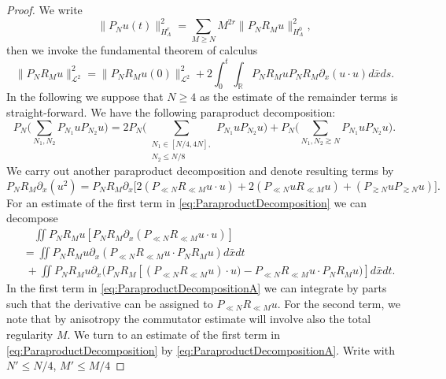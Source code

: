 \documentclass{amsart}
\theoremstyle{definition}
\newcommand{\R}{\mathbb{R}}
\begin{document}
\begin{proof}
We write
\begin{equation*}
\| P_N u(t) \|^2_{H^r_{\Lambda}} = \sum_{M \geq N} M^{2 r} \| P_N R_M u \|^2_{H^0_\Lambda},
\end{equation*}
then we invoke the fundamental theorem of calculus
\begin{equation*}
\| P_N R_M u \|^2_{\mathcal{L}^2} = \| P_N R_M u(0) \|^2_{\mathcal{L}^2} + 2 \int_0^t \int_{\R} P_N R_M u P_N R_M \partial_x (u \cdot u) d\overline{x} ds.
\end{equation*}
In the following we suppose that $N \geq 4$ as the estimate of the remainder terms is straight-forward. We have the following paraproduct decomposition:
\begin{equation*}
P_N \big( \sum_{N_1,N_2} P_{N_1} u P_{N_2} u \big) = 2 P_N \big( \sum_{\substack{N_1 \in [N/4,4N], \\ N_2 \leq N/8}} P_{N_1} u P_{N_2} u \big) + P_N \big( \sum_{N_1,N_2 \gtrsim N} P_{N_1} u P_{N_2} u \big).
\end{equation*}
We carry out another paraproduct decomposition and denote resulting terms by
\begin{equation}
\label{eq:ParaproductDecomposition}
P_N R_M \partial_x (u^2) = P_N R_M \partial_x \big[ 2(P_{\ll N} R_{\ll M} u \cdot u) + 2 (P_{\ll N} u R_{\ll M} u) + (P_{\gtrsim N} u P_{\gtrsim N} u) \big].
\end{equation}
For an estimate of the first term in \eqref{eq:ParaproductDecomposition}
we can decompose
\begin{equation}
\label{eq:ParaproductDecompositionA}
\begin{split}
&\quad \iint P_N R_M u [P_N R_M \partial_x (P_{\ll N} R_{\ll M} u \cdot u)] \\
&= \iint P_N R_M u \partial_x (P_{\ll N} R_{\ll M} u \cdot P_N R_M u) d\bar{x} dt \\
&\; + \iint P_N R_M u \partial_x (P_N R_M [(P_{\ll N} R_{\ll M} u) \cdot u) - P_{\ll N} R_{\ll M} u \cdot P_N R_M u) ] d \bar{x} dt.
\end{split} 
\end{equation}
In the first term in \eqref{eq:ParaproductDecompositionA} we can integrate by parts such that the derivative can be assigned to $P_{\ll N} R_{\ll M} u$. For the second term, we note that by anisotropy the commutator estimate will involve also the total regularity $M$.
We turn to an estimate of the first term in \eqref{eq:ParaproductDecomposition} by \eqref{eq:ParaproductDecompositionA}. Write with $N' \leq N/4$, $M' \leq M/4$

\end{proof}
\end{document}
